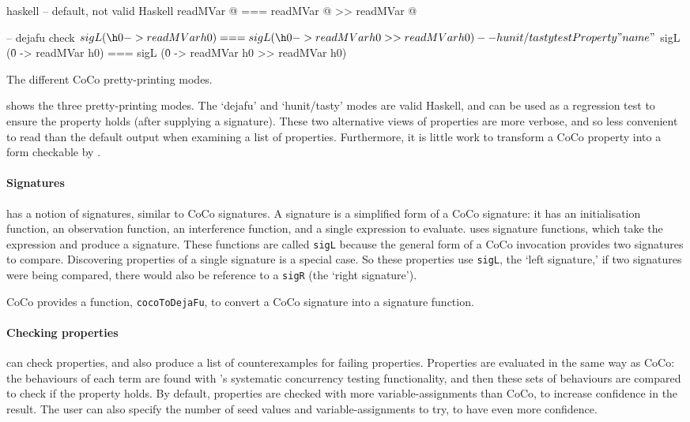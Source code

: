 \begin{listing}
  \centering
  \begin{cminted}{haskell}
-- default, not valid Haskell
readMVar @  ===  readMVar @ >> readMVar @

-- dejafu
check $ sigL (\h0 -> readMVar h0) === sigL (\h0 -> readMVar h0 >> readMVar h0)

-- hunit/tasty
testProperty "name" $
  sigL (\h0 -> readMVar h0) === sigL (\h0 -> readMVar h0 >> readMVar h0)
  \end{cminted}
  \caption{The different CoCo pretty-printing modes.}\label{lst:coco_ppr}
\end{listing}

 shows the three pretty-printing modes.  The
`dejafu' and `hunit/tasty' modes are valid Haskell, and can be used as
a regression test to ensure the property holds (after supplying a
signature).  These two alternative views of properties are more
verbose, and so less convenient to read than the default output when
examining a list of properties.  Furthermore, it is little work to
transform a CoCo property into a form checkable by \dejafu{}.

\paragraph{Signatures}
\dejafu{} has a notion of signatures, similar to CoCo signatures.  A
\dejafu{} signature is a simplified form of a CoCo signature: it has
an initialisation function, an observation function, an interference
function, and a single expression to evaluate.  
uses signature functions, which take the expression and produce a
signature.  These functions are called \texttt{sigL} because the
general form of a CoCo invocation provides two signatures to compare.
Discovering properties of a single signature is a special case.  So
these properties use \verb|sigL|, the `left signature,' if two
signatures were being compared, there would also be reference to a
\texttt{sigR} (the `right signature').

CoCo provides a function, \texttt{cocoToDejaFu}, to convert a CoCo
signature into a \dejafu{} signature function.

\paragraph{Checking properties}
\dejafu{} can check properties, and also produce a list of
counterexamples for failing properties.  Properties are evaluated in
the same way as CoCo: the behaviours of each term are found with
\dejafu{}'s systematic concurrency testing functionality, and then
these sets of behaviours are compared to check if the property holds.
By default, properties are checked with more variable-assignments than
CoCo, to increase confidence in the result.  The user can also specify
the number of seed values and variable-assignments to try, to have
even more confidence.

